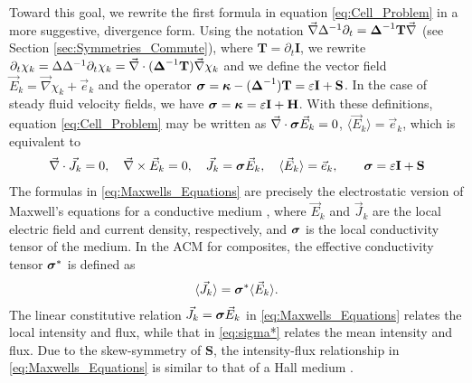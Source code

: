 \documentclass[11pt]{amsart}
\newcommand{\Tb}{\mathbf{T}}
\newcommand{\Hb}{\mathbf{H}}
\newcommand{\Ib}{\mathbf{I}}
\newcommand{\Sb}{\mathbf{S}}
\newcommand\bsig{\mbox{\boldmath${\sigma}$}}
\newcommand\bDelta{\mbox{\boldmath${\Delta}$}}
\newcommand\bkappa{\mbox{\boldmath${\kappa}$}}
\begin{document}
Toward this goal, we rewrite the first formula in equation
\eqref{eq:Cell_Problem} in a more suggestive, divergence
form. Using the notation $\vec{\nabla}\Delta^{-1}\partial_t=\bDelta^{-1}\Tb\vec{\nabla}$
(see Section \ref{sec:Symmetries_Commute}), where $\Tb=\partial_t\Ib$,  we
rewrite \cite{Fannjiang:SIAM_JAM:333}
$\partial_t\chi_k=\Delta\Delta^{-1}\partial_t\chi_k=\vec{\nabla}\cdot(\bDelta^{-1}\Tb)\vec{\nabla}\chi_k$ and we
define the vector field $\vec{E}_k=\vec{\nabla}\chi_k+\vec{e}_k$ and the
operator $\bsig=\bkappa-(\bDelta^{-1})\Tb=\varepsilon\Ib+\Sb$.  In the case of steady
fluid velocity fields, we have $\bsig=\bkappa=\varepsilon\Ib+\Hb$. With these
definitions, equation \eqref{eq:Cell_Problem} may be written as 
$\vec{\nabla}\cdot\bsig\vec{E}_k=0$, $\langle\vec{E}_k\rangle=\vec{e}_k$, which is
equivalent to    
%
\begin{align}\label{eq:Maxwells_Equations}    
  \vec{\nabla}\cdot\vec{J}_k=0, \quad
  \vec{\nabla}\times\vec{E}_k=0, \quad
  \vec{J}_k=\bsig\vec{E}_k,\quad
  \langle\vec{E}_k\rangle=\vec{e}_k,\qquad
  \bsig%
       =\varepsilon\Ib+\Sb
\end{align}
%
The formulas in \eqref{eq:Maxwells_Equations} are precisely the
electrostatic version of Maxwell's equations for a conductive medium
\cite{Golden:CMP-473}, where $\vec{E}_k$ and $\vec{J}_k$ are the local
electric field and current density, respectively, and $\bsig$ is the
local conductivity tensor of the medium. In the ACM for composites,
the effective conductivity tensor $\bsig^*$ is defined as
% 
\begin{align}\label{eq:sigma*}
  \langle\vec{J}_k\rangle=\bsig^*\langle\vec{E}_k\rangle.
\end{align}
%
The linear constitutive relation $\vec{J}_k=\bsig\vec{E}_k$ in
\eqref{eq:Maxwells_Equations} relates the local intensity and flux,
while that in \eqref{eq:sigma*} relates the mean intensity and
flux. Due to the skew-symmetry of $\Sb$, the intensity-flux
relationship in \eqref{eq:Maxwells_Equations} is similar to that of a
Hall medium \cite{Isichenko:JNS:1991:375}.
\end{document}
